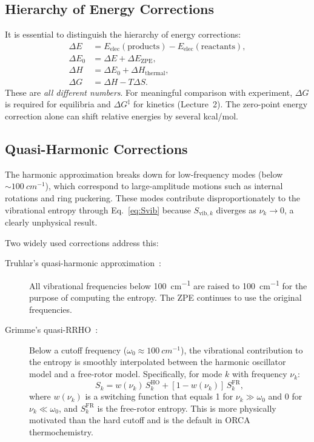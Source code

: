 \documentclass[11pt]{article}
\numberwithin{equation}{section}
\begin{document}
\subsection{Hierarchy of Energy Corrections}

It is essential to distinguish the hierarchy of energy corrections:
\begin{align}
\Delta E &= E_\text{elec}(\text{products}) - E_\text{elec}(\text{reactants}), \label{eq:DeltaE}\\
\Delta E_0 &= \Delta E + \Delta E_\text{ZPE}, \label{eq:DeltaE0}\\
\Delta H &= \Delta E_0 + \Delta H_\text{thermal}, \label{eq:DeltaH}\\
\Delta G &= \Delta H - T\Delta S. \label{eq:DeltaG}
\end{align}
These are \emph{all different numbers}. For meaningful comparison with experiment, $\Delta G$ is required for equilibria and $\Delta G^\ddagger$ for kinetics (Lecture~2). The zero-point energy correction alone can shift relative energies by several kcal/mol.

\subsection{Quasi-Harmonic Corrections}
\label{sec:quasi_harmonic}

The harmonic approximation breaks down for low-frequency modes (below $\sim\!\SI{100}{cm^{-1}}$), which correspond to large-amplitude motions such as internal rotations and ring puckering. These modes contribute disproportionately to the vibrational entropy through Eq.~\eqref{eq:Svib} because $S_{\text{vib},k}$ diverges as $\nu_k \to 0$, a clearly unphysical result.

Two widely used corrections address this:

\begin{description}
\item[Truhlar's quasi-harmonic approximation~\cite{TruhlarQH}:] All vibrational frequencies below \SI{100}{cm^{-1}} are raised to \SI{100}{cm^{-1}} for the purpose of computing the entropy. The ZPE continues to use the original frequencies.

\item[Grimme's quasi-RRHO~\cite{GrimmeQRRHO2012}:] Below a cutoff frequency ($\omega_0 \approx \SI{100}{cm^{-1}}$), the vibrational contribution to the entropy is smoothly interpolated between the harmonic oscillator model and a free-rotor model. Specifically, for mode $k$ with frequency $\nu_k$:
\begin{equation}
S_k = w(\nu_k)\,S_k^\text{HO} + [1 - w(\nu_k)]\,S_k^\text{FR},
\end{equation}
where $w(\nu_k)$ is a switching function that equals 1 for $\nu_k \gg \omega_0$ and 0 for $\nu_k \ll \omega_0$, and $S_k^\text{FR}$ is the free-rotor entropy. This is more physically motivated than the hard cutoff and is the default in ORCA thermochemistry.
\end{description}
\end{document}
